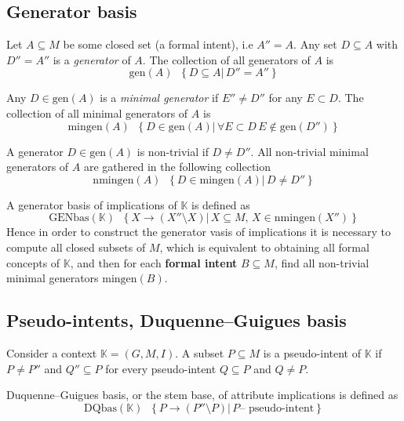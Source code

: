 \documentclass[a4paper]{article}
\newcommand{\obj}[1]{{\left\{ #1 \right \}}}
\newcommand{\brac}[1]{{\left ( #1 \right )}}
\newcommand{\induc}[1]{{\left . #1 \right \vert}}
\newcommand{\Ctx}{\mathbb{K}}
\newcommand{\defn}{\mathop{\overset{\Delta}{=}}\nolimits}
\begin{document}

\subsection{Generator basis} %
\label{sub:generator_basis}

Let $A\subseteq M$ be some closed set (a formal intent), i.e $A'' = A$. Any set $D\subseteq A$ with $D'' = A''$ is a \emph{generator} of $A$. The collection of all generators of $A$ is \[\text{gen}(A) \defn \obj{\induc{D\subseteq A}\, D'' = A'' }\]

Any $D\in \text{gen}(A)$ is a \emph{minimal generator} if $E'' \neq D''$ for any $E\subset D$. The collection of all minimal generators of $A$ is \[\text{mingen}(A) \defn \obj{ \induc{D\in \text{gen}(A)}\, \forall E\subset D\, E\notin \text{gen}(D'')}\]

A generator $D\in\text{gen}(A)$ is non-trivial if $D\neq D''$. All non-trivial minimal generators of $A$ are gathered in the following collection \[\text{nmingen}(A) \defn \obj{\induc{D\in\text{mingen}(A)}\,D\neq D'' }\]

A generator basis of implications of $\Ctx$ is defined as \[\text{GENbas}(\Ctx)\defn \obj{\induc{ X\to \brac{X''\setminus X} }\, X\subseteq M,\, X\in \text{nmingen}(X'')}\] Hence in order to construct the generator vasis of implications it is necessary to compute all closed subsets of $M$, which is equivalent to obtaining all formal concepts of $\Ctx$, and then for each \textbf{formal intent} $B\subseteq M$, find all non-trivial minimal generators $\text{mingen}(B)$.



\subsection{Pseudo-intents, Duquenne–Guigues basis} %
\label{sub:pseudointents}

Consider a context $\Ctx=\brac{G,M,I}$. A subset $P\subseteq M$ is a pseudo-intent of $\Ctx$ if $P\neq P''$ and $Q''\subseteq P$ for every pseudo-intent $Q\subseteq P$ and $Q\neq P$.

Duquenne–Guigues basis, or the stem base, of attribute implications is defined as \[\text{DQbas}(\Ctx)\defn \obj{\induc{ P\to \brac{P''\setminus P} }\, P \text{-- pseudo-intent} }\]
\end{document}
